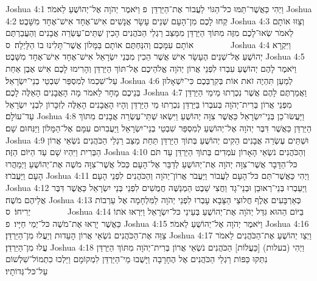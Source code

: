Joshua 4:1	וַיְהִי כַּאֲשֶׁר־תַּמּוּ כל־הַגּוֹי לַעֲבוֹר אֶת־הַיַּרְדֵּן {פ} וַיֹּאמֶר יְהֹוָה אֶל־יְהוֹשֻׁעַ לֵאמֹר׃
Joshua 4:2	קְחוּ לָכֶם מִן־הָעָם שְׁנֵים עָשָׂר אֲנָשִׁים אִישׁ־אֶחָד אִישׁ־אֶחָד מִשָּׁבֶט׃
Joshua 4:3	וְצַוּוּ אוֹתָם לֵאמֹר שְׂאוּ־לָכֶם מִזֶּה מִתּוֹךְ הַיַּרְדֵּן מִמַּצַּב רַגְלֵי הַכֹּהֲנִים הָכִין שְׁתֵּים־עֶשְׂרֵה אֲבָנִים וְהַעֲבַרְתֶּם אוֹתָם עִמָּכֶם וְהִנַּחְתֶּם אוֹתָם בַּמָּלוֹן אֲשֶׁר־תָּלִינוּ בוֹ הַלָּיְלָה׃ {ס}        
Joshua 4:4	וַיִּקְרָא יְהוֹשֻׁעַ אֶל־שְׁנֵים הֶעָשָׂר אִישׁ אֲשֶׁר הֵכִין מִבְּנֵי יִשְׂרָאֵל אִישׁ־אֶחָד אִישׁ־אֶחָד מִשָּׁבֶט׃
Joshua 4:5	וַיֹּאמֶר לָהֶם יְהוֹשֻׁעַ עִבְרוּ לִפְנֵי אֲרוֹן יְהֹוָה אֱלֹהֵיכֶם אֶל־תּוֹךְ הַיַּרְדֵּן וְהָרִימוּ לָכֶם אִישׁ אֶבֶן אַחַת עַל־שִׁכְמוֹ לְמִסְפַּר שִׁבְטֵי בְנֵי־יִשְׂרָאֵל׃
Joshua 4:6	לְמַעַן תִּהְיֶה זֹאת אוֹת בְּקִרְבְּכֶם כִּי־יִשְׁאָלוּן בְּנֵיכֶם מָחָר לֵאמֹר מָה הָאֲבָנִים הָאֵלֶּה לָכֶם׃
Joshua 4:7	וַאֲמַרְתֶּם לָהֶם אֲשֶׁר נִכְרְתוּ מֵימֵי הַיַּרְדֵּן מִפְּנֵי אֲרוֹן בְּרִית־יְהֹוָה בְּעבְרוֹ בַּיַּרְדֵּן נִכְרְתוּ מֵי הַיַּרְדֵּן וְהָיוּ הָאֲבָנִים הָאֵלֶּה לְזִכָּרוֹן לִבְנֵי יִשְׂרָאֵל עַד־עוֹלָם׃
Joshua 4:8	וַיַּעֲשׂוּ־כֵן בְּנֵי־יִשְׂרָאֵל כַּאֲשֶׁר צִוָּה יְהוֹשֻׁעַ וַיִּשְׂאוּ שְׁתֵּי־עֶשְׂרֵה אֲבָנִים מִתּוֹךְ הַיַּרְדֵּן כַּאֲשֶׁר דִּבֶּר יְהֹוָה אֶל־יְהוֹשֻׁעַ לְמִסְפַּר שִׁבְטֵי בְנֵי־יִשְׂרָאֵל וַיַּעֲבִרוּם עִמָּם אֶל־הַמָּלוֹן וַיַּנִּחוּם שָׁם׃
Joshua 4:9	וּשְׁתֵּים עֶשְׂרֵה אֲבָנִים הֵקִים יְהוֹשֻׁעַ בְּתוֹךְ הַיַּרְדֵּן תַּחַת מַצַּב רַגְלֵי הַכֹּהֲנִים נֹשְׂאֵי אֲרוֹן הַבְּרִית וַיִּהְיוּ שָׁם עַד הַיּוֹם הַזֶּה׃
Joshua 4:10	וְהַכֹּהֲנִים נֹשְׂאֵי הָאָרוֹן עֹמְדִים בְּתוֹךְ הַיַּרְדֵּן עַד תֹּם כּל־הַדָּבָר אֲשֶׁר־צִוָּה יְהֹוָה אֶת־יְהוֹשֻׁעַ לְדַבֵּר אֶל־הָעָם כְּכֹל אֲשֶׁר־צִוָּה מֹשֶׁה אֶת־יְהוֹשֻׁעַ וַיְמַהֲרוּ הָעָם וַיַּעֲבֹרוּ׃
Joshua 4:11	וַיְהִי כַּאֲשֶׁר־תַּם כּל־הָעָם לַעֲבוֹר וַיַּעֲבֹר אֲרוֹן־יְהֹוָה וְהַכֹּהֲנִים לִפְנֵי הָעָם׃
Joshua 4:12	וַיַּעַבְרוּ בְּנֵי־רְאוּבֵן וּבְנֵי־גָד וַחֲצִי שֵׁבֶט הַמְנַשֶּׁה חֲמֻשִׁים לִפְנֵי בְּנֵי יִשְׂרָאֵל כַּאֲשֶׁר דִּבֶּר אֲלֵיהֶם מֹשֶׁה׃
Joshua 4:13	כְּאַרְבָּעִים אֶלֶף חֲלוּצֵי הַצָּבָא עָבְרוּ לִפְנֵי יְהֹוָה לַמִּלְחָמָה אֶל עַרְבוֹת יְרִיחוֹ׃ {ס}        
Joshua 4:14	בַּיּוֹם הַהוּא גִּדַּל יְהֹוָה אֶת־יְהוֹשֻׁעַ בְּעֵינֵי כּל־יִשְׂרָאֵל וַיִּרְאוּ אֹתוֹ כַּאֲשֶׁר יָרְאוּ אֶת־מֹשֶׁה כּל־יְמֵי חַיָּיו׃ {פ}
Joshua 4:15	וַיֹּאמֶר יְהֹוָה אֶל־יְהוֹשֻׁעַ לֵאמֹר׃
Joshua 4:16	צַוֵּה אֶת־הַכֹּהֲנִים נֹשְׂאֵי אֲרוֹן הָעֵדוּת וְיַעֲלוּ מִן־הַיַּרְדֵּן׃
Joshua 4:17	וַיְצַו יְהוֹשֻׁעַ אֶת־הַכֹּהֲנִים לֵאמֹר עֲלוּ מִן־הַיַּרְדֵּן׃
Joshua 4:18	וַיְהִי (בעלות) [כַּעֲלוֹת] הַכֹּהֲנִים נֹשְׂאֵי אֲרוֹן בְּרִית־יְהֹוָה מִתּוֹךְ הַיַּרְדֵּן נִתְּקוּ כַּפּוֹת רַגְלֵי הַכֹּהֲנִים אֶל הֶחָרָבָה וַיָּשֻׁבוּ מֵי־הַיַּרְדֵּן לִמְקוֹמָם וַיֵּלְכוּ כִתְמוֹל־שִׁלְשׁוֹם עַל־כּל־גְּדוֹתָיו׃
